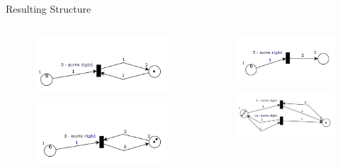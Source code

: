 \documentclass[12pt]{beamer}
\begin{document}
\begin{frame}{Resulting Structure}
\begin{columns}[]
  \begin{column}{2in}
  \begin{figure}
\includegraphics[scale=0.3]{PetriNet_1_1}

\end{figure}
\vspace{-5ex}
\begin{figure}
\includegraphics[scale=0.3,width=2in]{PetriNet_1_2}

\end{figure}
  \end{column}
  \begin{column}{2in}
  \begin{figure}
\includegraphics[scale=0.3]{PetriNet_1_3}
\vspace{-5ex}
\end{figure}
 \begin{figure}
\includegraphics[scale=0.3, width=2in]{PetriNet_1_4}

\end{figure}
  \end{column}
\end{columns}
\end{frame}
\end{document}

